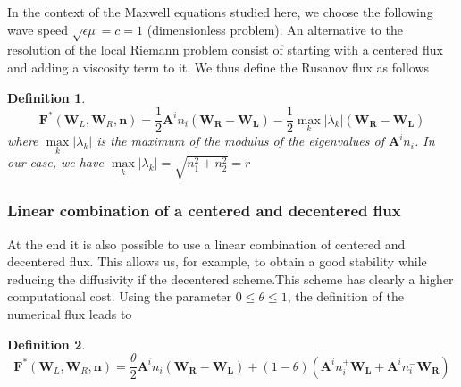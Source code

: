\documentclass[a4paper,oneside,10pt]{report}
\newtheorem{mydef}{Definition}
\begin{document}
In the context of the Maxwell equations studied here, we choose the following wave speed $\sqrt{\epsilon\mu} = c =1$ (dimensionless problem). An alternative 
to the resolution of the local Riemann problem consist of starting with a centered flux and adding a viscosity term to it. We thus define the Rusanov flux as follows
\begin{mydef}
\begin{equation}
 \mathbf{F}^*( \mathbf{W}_L,\mathbf{W}_R,\mathbf{n})  = \frac{1}{2}\mathbf{A}^i n_i(\mathbf{W_R} - \mathbf{W_L}) -\frac{1}{2}\max\limits_k |\lambda_k| (\mathbf{W_R} - \mathbf{W_L})
 \end{equation}
where $\max\limits_k |\lambda_k|$ is the maximum of the modulus of the eigenvalues of  $\mathbf{A}^i n_i$. In our case, we have $\max\limits_k |\lambda_k|=\sqrt{n_1^2 + n_2^2} = r$

\end{mydef}


\subsubsection{Linear combination of a centered and decentered flux}


At the end it is also possible to use a linear combination of centered and decentered flux. This allows us, for example, to obtain a good stability while reducing the diffusivity if the decentered scheme.This scheme has clearly a higher computational cost. Using the parameter $0 \leq \theta \leq 1$, the definition of the numerical flux leads to
\begin{mydef}
\begin{equation}
 \mathbf{F}^*( \mathbf{W}_L,\mathbf{W}_R,\mathbf{n})  = \frac{\theta}{2}\mathbf{A}^i n_i(\mathbf{W_R} - \mathbf{W_L}) + (1 -\theta)(\mathbf{A}^i n_i^+\mathbf{W_L} + \mathbf{A}^i n_i^-\mathbf{W_R})
 \end{equation}
\end{mydef}
\end{document}
